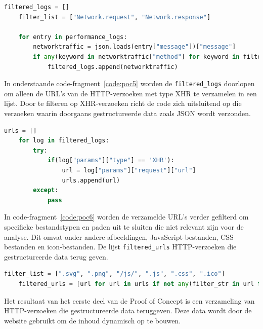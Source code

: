 \begin{lstlisting}[language=python, captionpos=b, caption={Filteren van performance-logs }, label={code:poc4}]
    filtered_logs = []
    filter_list = ["Network.request", "Network.response"]

    for entry in performance_logs:
        networktraffic = json.loads(entry["message"])["message"]
        if any(keyword in networktraffic["method"] for keyword in filter_list):
            filtered_logs.append(networktraffic)
\end{lstlisting}

In onderstaande code-fragment~\ref{code:poc5}  worden de \texttt{filtered\_logs} doorlopen om alleen de URL's van de HTTP-verzoeken met type XHR te verzamelen in een lijst. Door te filteren op XHR-verzoeken richt de code zich uitsluitend op die verzoeken waarin doorgaans gestructureerde data zoals JSON wordt verzonden.

\begin{lstlisting}[language=python, captionpos=b, caption={De URL's uit de HTTP-verzoeken halen}, label={code:poc5},]
    urls = []
    for log in filtered_logs:
        try:
            if(log["params"]["type"] == 'XHR'):
                url = log["params"]["request"]["url"]
                urls.append(url)
        except:
            pass
\end{lstlisting}


In code-fragment~\ref{code:poc6} worden de verzamelde URL's verder gefilterd om specifieke bestandstypen en paden uit te sluiten die niet relevant zijn voor de analyse. Dit omvat onder andere afbeeldingen, JavaScript-bestanden, CSS-bestanden en icon-bestanden. De lijst \texttt{filtered\_urls} HTTP-verzoeken die gestructureerde data terug geven.
\begin{lstlisting}[language=python, captionpos=b, caption={Ongewenste bestanden filteren}, label={code:poc6}]
    filter_list = [".svg", ".png", "/js/", ".js", ".css", ".ico"]
    filtered_urls = [url for url in urls if not any(filter_str in url for filter_str in filter_list)]
\end{lstlisting}

Het resultaat van het eerste deel van de Proof of Concept is een verzameling van HTTP-verzoeken die gestructureerde data teruggeven. Deze data wordt door de website gebruikt om de inhoud dynamisch op te bouwen.


